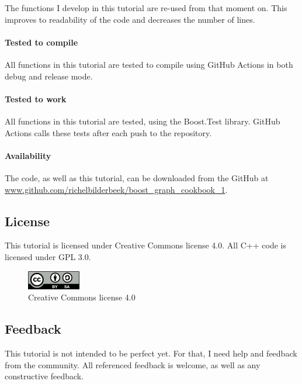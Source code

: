 The functions I develop in this tutorial are re-used from that moment on.
This improves to readability of the code and decreases the number of lines.

\paragraph{Tested to compile}

All functions in this tutorial are tested to compile using GitHub Actions in
both debug and release mode.

\paragraph{Tested to work}

All functions in this tutorial are tested, using the Boost.Test library.
GitHub Actions calls these tests after each push to the repository.

\paragraph{Availability}

The code, as well as this tutorial, can be downloaded from the GitHub at
\url{www.github.com/richelbilderbeek/boost_graph_cookbook_1}.

\subsection{License}

This tutorial is licensed under Creative Commons license 4.0.
All C++ code is licensed under GPL 3.0.

\begin{figure}[!htbp]
  \includegraphics[]{CC-BY-SA_icon.png}
  \caption{
    Creative Commons license 4.0
  }
  \label{fig:license}
\end{figure}

\subsection{Feedback}

This tutorial is not intended to be perfect yet.
For that, I need help and feedback from the community.
All referenced feedback is welcome, as well as any constructive feedback.

